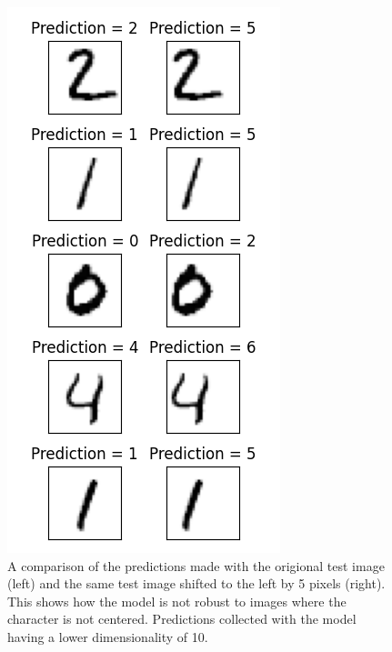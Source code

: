 \documentclass[12pt, twocolumn]{article}
\begin{document}
\begin{figure}
    \centering
    \includegraphics[width=\columnwidth]{images/shiftedComparison.png}
    \caption{A comparison of the predictions made with the origional test image (left) and the same test image shifted to the left by 5 pixels (right). This shows how the model is not robust to images where the character is not centered. Predictions collected with the model having a lower dimensionality of 10.%
      \label{fig:shiftedComparison}}
\end{figure}
\end{document}

